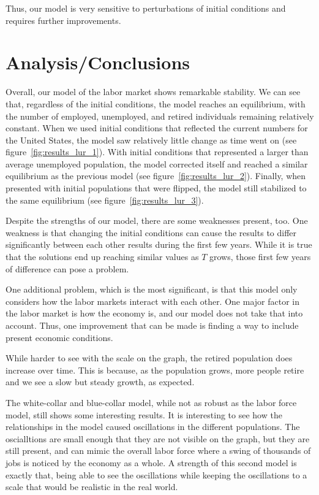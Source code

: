 \documentclass[11pt]{amsart}
\begin{document}
Thus, our model is very sensitive to perturbations of initial conditions and requires further improvements.

\section{Analysis/Conclusions}

Overall, our model of the labor market shows remarkable stability. 
We can see that, regardless of the initial conditions, the model reaches an equilibrium, 
with the number of employed, unemployed, and retired individuals remaining relatively constant.
When we used initial conditions that reflected the current numbers for the United States,
the model saw relatively little change as time went on (see figure~\ref{fig:results_lur_1}).
With initial conditions that represented a larger than average unemployed population, the model corrected itself and reached a
similar equilibrium as the previous model (see figure~\ref{fig:results_lur_2}).
Finally, when presented with initial populations that were flipped, the model still stabilized to the same equilibrium
(see figure~\ref{fig:results_lur_3}).

Despite the strengths of our model, there are some weaknesses present, too. One weakness is that
changing the initial conditions can cause the results to differ significantly between each other results during the first few years.
While it is true that the solutions end up reaching similar values as $T$ grows, those first few years of difference can pose a problem.

One additional problem, which is the most significant, is that this model only considers how the labor markets interact
with each other. One major factor in the labor market is how the economy is, and our model does not take that into account.
Thus, one improvement that can be made is finding a way to include present economic conditions.

While harder to see with the scale on the graph, the retired population does increase over time. 
This is because, as the population grows, more people retire and we see a slow but steady growth, as expected.

The white-collar and blue-collar model, while not as robust as the labor force model, still shows some interesting results. It is interesting to see how the relationships in the model
caused oscillations in the different populations. The oscialltions are small enough that they are not visible on the graph, but they are still present, and can mimic the overall 
labor force where a swing of thousands of jobs is noticed by the economy as a whole. A strength of this second model is exactly that, being able to see the oscillations while
keeping the oscillations to a scale that would be realistic in the real world.
\end{document}
